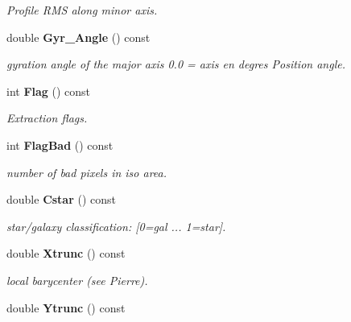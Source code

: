 \begin{CompactItemize}
\begin{CompactList}\small\item\em Profile RMS along minor axis.\item\end{CompactList}\item 
{}
double {\bf Gyr\_\-Angle} () const\label{class_sestar_a33}

\begin{CompactList}\small\item\em gyration angle of the major axis 0.0 = axis en degres Position angle.\item\end{CompactList}\item 
{}
int {\bf Flag} () const\label{class_sestar_a34}

\begin{CompactList}\small\item\em Extraction flags.\item\end{CompactList}\item 
{}
int {\bf Flag\-Bad} () const\label{class_sestar_a35}

\begin{CompactList}\small\item\em number of bad pixels in iso area.\item\end{CompactList}\item 
{}
double {\bf Cstar} () const\label{class_sestar_a36}

\begin{CompactList}\small\item\em star/galaxy classification: [0=gal ... 1=star].\item\end{CompactList}\item 
{}
double {\bf Xtrunc} () const\label{class_sestar_a37}

\begin{CompactList}\small\item\em local barycenter (see Pierre).\item\end{CompactList}\item 
{}
double {\bf Ytrunc} () const\label{class_sestar_a38}


\end{CompactItemize}
